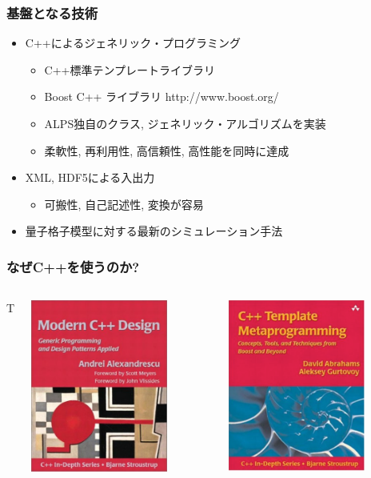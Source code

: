 \begin{frame}
  \frametitle{基盤となる技術}
  \begin{itemize}
    \setlength{\itemsep}{1em}
  \item C++によるジェネリック・プログラミング
    \begin{itemize}
    \item C++標準テンプレートライブラリ
    \item Boost C++ ライブラリ http://www.boost.org/
    \item ALPS独自のクラス, ジェネリック・アルゴリズムを実装
    \item 柔軟性, 再利用性, 高信頼性, 高性能を同時に達成
    \end{itemize}
  \item XML, HDF5による入出力
    \begin{itemize}
    \item 可搬性, 自己記述性, 変換が容易
    \end{itemize}
  \item 量子格子模型に対する最新のシミュレーション手法
  \end{itemize}
\end{frame}

\begin{frame}
  \frametitle{なぜC++を使うのか?}
  \begin{columns}{T}
    \begin{column}{.5\textwidth}
      \centering \includegraphics[width=4.5cm]{modern-cxx.pdf}
    \end{column}
    \begin{column}{.5\textwidth}
      \centering \includegraphics[width=4.5cm]{cxx-template.pdf}
    \end{column}
  \end{columns}
\end{frame}

